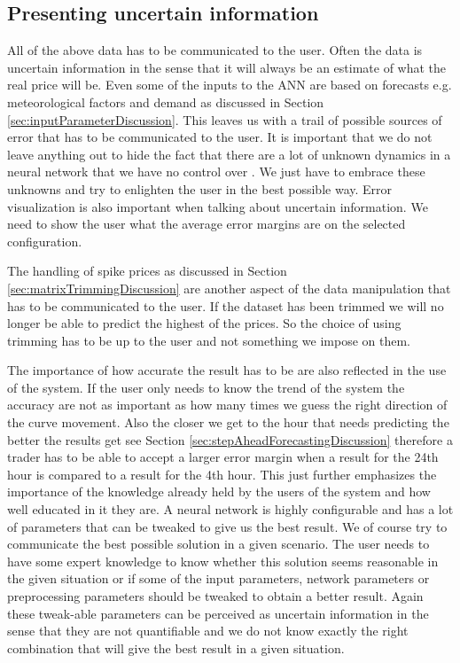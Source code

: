 \subsection{Presenting uncertain information}
All of the above data has to be communicated to the user. Often the data is uncertain information in the sense that it will always be an estimate of what the real price will be. Even some of the inputs to the ANN are based on forecasts e.g. meteorological factors and demand as discussed in Section \ref{sec:inputParameterDiscussion}. This leaves us with a trail of possible sources of error that has to be communicated to the user. It is important that we do not leave anything out to hide the fact that there are a lot of unknown dynamics in a neural network that we have no control over \cite{young2010using}. We just have to embrace these unknowns and try to enlighten the user in the best possible way. Error visualization is also important when talking about uncertain information. We need to show the user what the average error margins are on the selected configuration.

The handling of spike prices as discussed in Section \ref{sec:matrixTrimmingDiscussion} are another aspect of the data manipulation that has to be communicated to the user. If the dataset has been trimmed we will no longer be able to predict the highest of the prices. So the choice of using trimming has to be up to the user and not something we impose on them.

The importance of how accurate the result has to be are also reflected in the use of the system. If the user only needs to know the trend of the system the accuracy are not as important as how many times we guess the right direction of the curve movement. Also the closer we get to the hour that needs predicting the better the results get see Section \ref{sec:stepAheadForecastingDiscussion} therefore a trader has to be able to accept a larger error margin when a result for the 24th hour is compared to a result for the 4th hour. This just further emphasizes the importance of the knowledge already held by the users of the system and how well educated in it they are. A neural network is highly configurable and has a lot of parameters that can be tweaked to give us the best result. We of course try to communicate the best possible solution in a given scenario. The user needs to have some expert knowledge to know whether this solution seems reasonable in the given situation or if some of the input parameters, network parameters or preprocessing parameters should be tweaked to obtain a better result. Again these tweak-able parameters can be perceived as uncertain information \cite{UncertainInformation} in the sense that they are not quantifiable and we do not know exactly the right combination that will give the best result in a given situation. 

